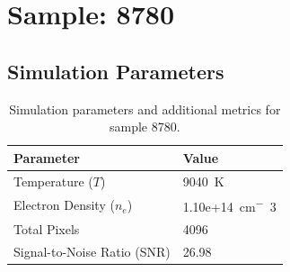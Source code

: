 \documentclass[a4paper,11pt]{article}
\begin{document}
\clearpage

\section{Sample: 8780}
\subsection{Simulation Parameters}
\begin{table}[h!]
    \centering
    \begin{tabular}{ll}
        \toprule
        \textbf{Parameter} & \textbf{Value} \\
        \midrule
        Temperature ($T$) & 9040 \,\si{K} \\
        Electron Density ($n_e$) & 1.10e+14 \,\si{cm^-3} \\
        Total Pixels & 4096 \\
        Signal-to-Noise Ratio (SNR) & 26.98 \\
        \bottomrule
    \end{tabular}
    \caption{Simulation parameters and additional metrics for sample 8780.}
    \label{tab:params_8780}
\end{table}
\end{document}
